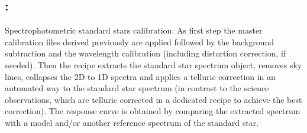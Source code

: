 \subsection{:}
Spectrophotometric standard stars calibration: As first step the
master calibration files derived previously are applied followed by the background subtraction and 
the wavelength calibration (including distortion correction, if needed). Then the recipe extracts the
standard star spectrum object, removes sky lines, collapses the 2D to
1D spectra and applies a telluric correction in an automated way to
the standard star spectrum (in contrast to the science observations,
which are telluric corrected in a dedicated recipe to achieve the best
correction). The response curve is obtained by comparing the extracted
spectrum with a model and/or another reference spectrum of the
standard star.
